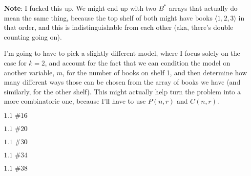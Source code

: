 \documentclass{article}
\newcommand{\problem}[2]{$\boxed{\text{#1 \##2}}$}
\begin{document}
\begin{multicols*}{2}
\textbf{Note}: I fucked this up. We might end up with two $B^*$ arrays
that actually do mean the same thing, because the top shelf of both
might have books $\langle{}1,2,3\rangle$ in that order, and this is
indistinguishable from each other (aka, there's double counting going
on).

I'm going to have to pick a slightly different model, where I focus
solely on the case for $k=2$, and account for the fact that we can
condition the model on another variable, $m$, for the number of books
on shelf 1, and then determine how many different ways those can be
chosen from the array of books we have (and similarly, for the other
shelf). This might actually help turn the problem into a more
combinatoric one, because I'll have to use $P(n,r)$ and $C(n,r)$.

%
\problem{1.1}{16}



%
\problem{1.1}{20}



%
\problem{1.1}{30}



%
\problem{1.1}{34}



%
\problem{1.1}{38}




\end{multicols*}
\end{document}
